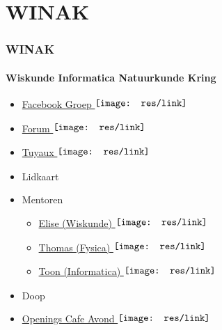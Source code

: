     \section{WINAK}
	\begin{frame}
		\frametitle{WINAK}
		\framesubtitle{\textbf{W}iskunde \textbf{I}nformatica \textbf{Na}tuurkunde \textbf{K}ring}
        
        \begin{itemize}
            \item\href{https://www.facebook.com/groups/2156957474519310/}{Facebook Groep $\vcenter{\hbox{\texttt{[image: res/link]}}\vspace{0.1cm}}$}
            \item\href{https://forum.winak.be/}{Forum $\vcenter{\hbox{\texttt{[image: res/link]}}\vspace{0.1cm}}$}
            \item\href{http://tuyaux.winak.be/}{Tuyaux $\vcenter{\hbox{\texttt{[image: res/link]}}\vspace{0.1cm}}$}
            \item Lidkaart
            \item Mentoren
            \begin{itemize}
            	\item\href {https://www.facebook.com/elise.verlinden.9} {Elise (Wiskunde) $\vcenter{\hbox{\texttt{[image: res/link]}}\vspace{0.1cm}}$}
            	\item\href {https://www.facebook.com/profile.php?id=100009929418782} {Thomas (Fysica) $\vcenter{\hbox{\texttt{[image: res/link]}}\vspace{0.1cm}}$}
				\item\href {https://www.facebook.com/toon.meynen.3} {Toon (Informatica) $\vcenter{\hbox{\texttt{[image: res/link]}}\vspace{0.1cm}}$}
			\end{itemize}
			\item Doop
            \item\href{https://www.facebook.com/events/278437369338614}{Openings Cafe Avond $\vcenter{\hbox{\texttt{[image: res/link]}}\vspace{0.1cm}}$}
            
		\end{itemize}

	\end{frame}
    
